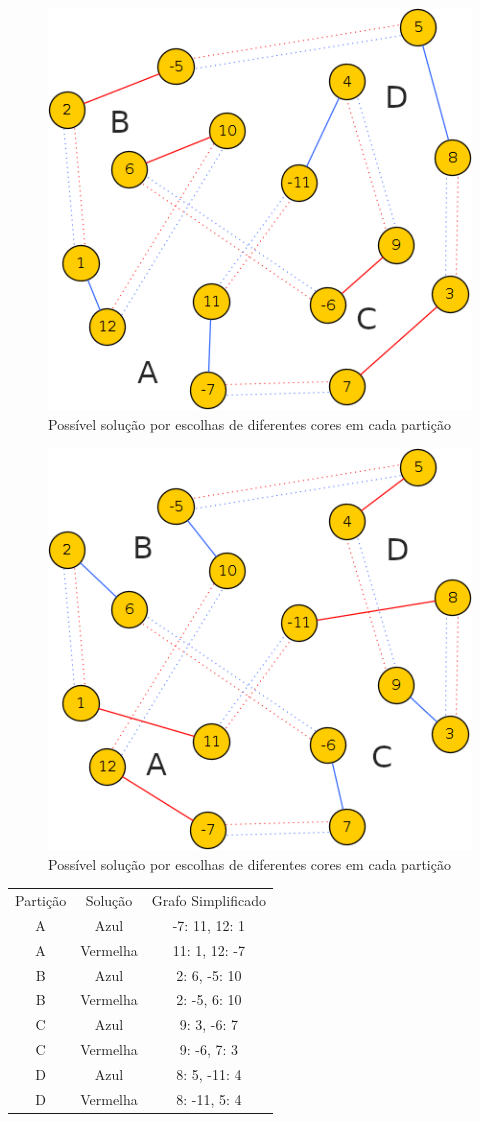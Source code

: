 \documentclass[
	article,			%
	11pt,				%
	oneside,			%
	a4paper,			%
	english,			%
	brazil,				%
	sumario=tradicional
	]{abntex2}
\begin{document}
\begin{figure}[tbph!]
	\centering
	\includegraphics[width=0.5\linewidth]{fig-7}
	\caption{Possível solução por escolhas de diferentes cores em cada partição}
	\label{fig-7}
\end{figure}

\begin{figure}[tbph!]
	\centering
	\includegraphics[width=0.5\linewidth]{fig-8}
	\caption{Possível solução por escolhas de diferentes cores em cada partição}
	\label{fig-8}
\end{figure}

\begin{table}[tbph!]
	\label{tab-2}
	\centering
	\begin{tabular}{ccc}
		Partição & Solução & Grafo Simplificado \\
		A & Azul & -7: 11, 12: 1 \\
		A & Vermelha & 11: 1, 12: -7 \\
		B & Azul & 2: 6, -5: 10 \\
		B & Vermelha & 2: -5, 6: 10 \\
		C & Azul & 9: 3, -6: 7 \\
		C & Vermelha & 9: -6, 7: 3 \\
		D & Azul & 8: 5, -11: 4 \\
		D & Vermelha & 8: -11, 5: 4
	\end{tabular}
\end{table}
\end{document}

